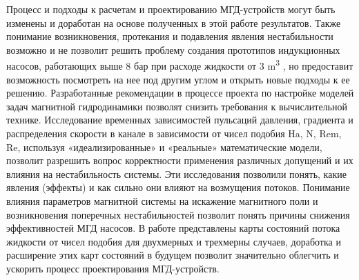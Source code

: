 {\influence} Процесс и подходы к расчетам и проектированию МГД-устройств могут быть изменены и доработан на основе полученных в этой работе результатов. Также понимание возникновения, протекания и подавления явления нестабильности возможно и не позволит решить проблему создания прототипов индукционных насосов, работающих выше 8 $бар$ при расходе жидкости от 3 \si{\metre^3} , но предоставит возможность посмотреть на нее под другим углом и открыть новые подходы к ее решению. Разработанные рекомендации в процессе проекта по настройке моделей задач магнитной гидродинамики позволят снизить требования к вычислительной технике. Исследование временных зависимостей пульсаций давления, градиента и распределения скорости в канале в зависимости от чисел подобия Ha, N, Rem, Re, используя «идеализированные» и «реальные» математические модели, позволит разрешить вопрос корректности применения различных допущений и их влияния на нестабильность системы. Эти исследования позволили понять, какие явления (эффекты) и как сильно они влияют на возмущения потоков. Понимание влияния параметров магнитной системы на искажение магнитного поли и возникновения поперечных нестабильностей позволит понять причины снижения эффективностей МГД насосов. В работе представлены карты состояний потока жидкости от чисел подобия для двухмерных и трехмерны случаев, доработка и расширение этих карт состояний в будущем позволит значительно облегчить и ускорить процесс проектирования МГД-устройств. 

